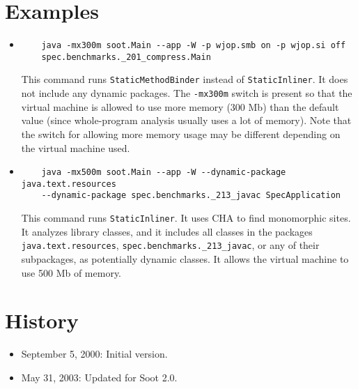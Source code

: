 \documentclass{article}
\begin{document}
\section{Examples}
\begin{itemize}
\item 
\begin{verbatim} 
    java -mx300m soot.Main --app -W -p wjop.smb on -p wjop.si off
    spec.benchmarks._201_compress.Main
\end{verbatim}
This command runs {\tt StaticMethodBinder} instead of {\tt StaticInliner}. It does not include any dynamic packages. 
The {\tt -mx300m} switch is present so that the virtual machine is allowed to use more memory 
(300 Mb) than the default value (since whole-program analysis usually uses a lot of memory). Note
that the switch for allowing more memory usage may be different depending on the virtual machine used.
\item
\begin{verbatim}
    java -mx500m soot.Main --app -W --dynamic-package java.text.resources
    --dynamic-package spec.benchmarks._213_javac SpecApplication
\end{verbatim}
This command runs {\tt StaticInliner}. It uses CHA to find monomorphic
sites. It analyzes library classes, and it includes all classes in the packages
{\tt java.text.resources}, 
{\tt spec.benchmarks.\_213\_javac}, or any of their subpackages,
as potentially dynamic classes. It allows the virtual machine to use 500 Mb of memory.
\end{itemize}
\section*{History}
\begin{itemize}
\item September 5, 2000: Initial version.
\item May 31, 2003: Updated for Soot 2.0.
\end{itemize}
\end{document}
